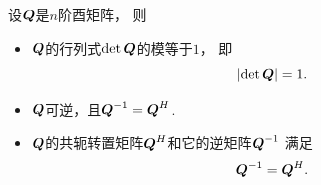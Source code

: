 \begin{property}
设\(\boldsymbol{Q}\)是\(n\)阶酉矩阵，
则\begin{itemize}
	\item \(\boldsymbol{Q}\)的行列式\(\det\boldsymbol{Q}\)的模等于\(1\)，
	即\begin{equation}\label{equation:幺正矩阵.幺正矩阵的行列式}
		\abs{\det\boldsymbol{Q}}=1.
	\end{equation}

	\item \(\boldsymbol{Q}\)可逆，且\(\boldsymbol{Q}^{-1} = \boldsymbol{Q}^H\).

	\item \(\boldsymbol{Q}\)的共轭转置矩阵\(\boldsymbol{Q}^H\)和它的逆矩阵\(\boldsymbol{Q}^{-1}\)
	满足\begin{equation}\label{equation:幺正矩阵.幺正矩阵的转置等于幺正矩阵的逆}
		\boldsymbol{Q}^{-1} = \boldsymbol{Q}^H.
	\end{equation}
\end{itemize}
\end{property}

